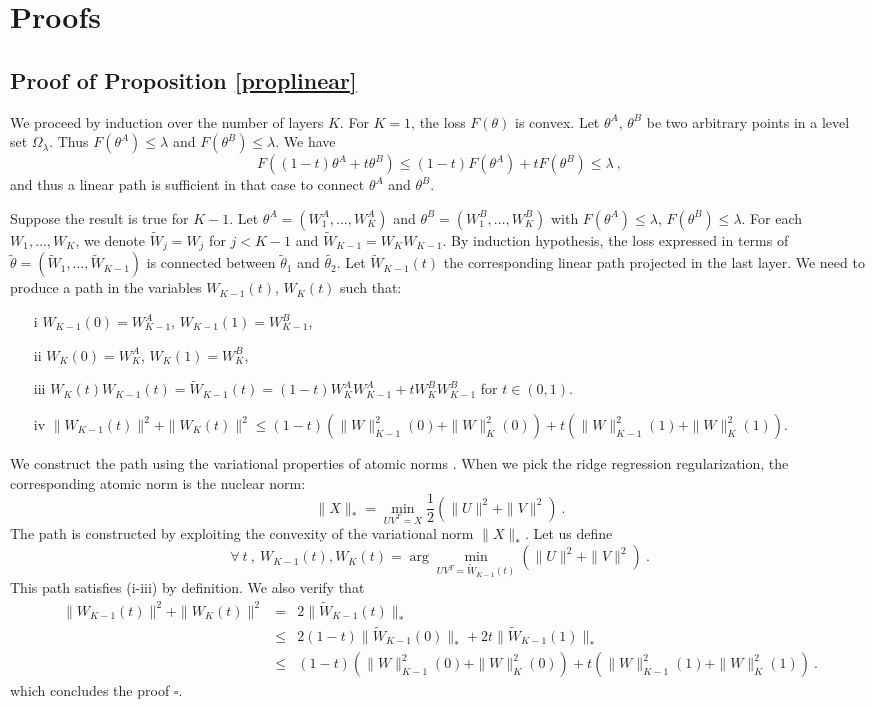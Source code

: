 \section{Proofs}

\subsection{Proof of Proposition \ref{proplinear}}

We proceed by induction over the number of layers $K$. 
For $K=1$, the loss $F(\theta)$ is convex. Let  $\theta^A$, $\theta^B$ be two arbitrary points 
in a level set $\Omega_\lambda$. Thus $F(\theta^A) \leq \lambda$ and $F(\theta^B) \leq \lambda$. We have
$$F( (1-t) \theta^A + t \theta^B) \leq (1-t) F(\theta^A) + t F(\theta^B) \leq \lambda~,$$
and thus a linear path is sufficient in that case to connect $\theta^A$ and $\theta^B$.

Suppose the result is true for $K-1$. Let $\theta^A = (W_1^A, \dots, W^A_K)$ and 
 $\theta^B = (W_1^B, \dots, W^B_K)$ with $F(\theta^A) \leq \lambda$, $F(\theta^B) \leq \lambda$.
For each $W_1, \dots, W_K$, we denote $\tilde{W}_j = W_j$ for $j < K-1$ and
$\tilde{W}_{K-1} = W_K W_{K-1}$. By induction hypothesis, the 
loss expressed in terms of $\tilde{\theta} = (\tilde{W}_1, \dots, \tilde{W}_{K-1})$ is connected 
between $\tilde{\theta}_1$ and $\tilde{\theta_2}$. Let $\tilde{W}_{K-1}(t)$ the corresponding 
linear path projected in the last layer. 
We need to produce a path in the variables $W_{K-1}(t)$, $W_K(t)$ 
such that:
\begin{itemize}
\item[i] $W_{K-1}(0) = W_{K-1}^A$, $W_{K-1}(1) = W_{K-1}^B$, 
\item[ii] $W_{K}(0) = W_{K}^A$, $W_{K}(1) = W_{K}^B$,
\item[iii] $W_{K}(t) W_{K-1}(t) = \tilde{W}_{K-1}(t) = (1-t) W_{K}^A W_{K-1}^A + t W_{K}^B W_{K-1}^B $ for $t \in (0,1)$. 
\item[iv] $\| W_{K-1}(t) \|^2 + \| W_{K}(t) \|^2 \leq (1-t) ( \| W \|_{K-1}^2(0) + \| W \|_{K}^2(0)  ) + t (\| W \|_{K-1}^2(1) + \| W \|_{K}^2(1))$.
\end{itemize} 
We construct the path using the variational properties of atomic norms \cite{bachatomic}. 
When we pick the ridge regression regularization, the corresponding atomic norm is the 
nuclear norm:
$$\| X \|_{*} = \min_{UV^T = X} \frac{1}{2}( \| U \|^2 + \| V \|^2)~.$$
The path is constructed by exploiting the convexity of the variational norm $\| X\|_{*}$. 
Let us define 
$$\forall~t~,~W_{K-1}(t), W_{K}(t) = \arg\min_{UV^T= \tilde{W}_{K-1}(t)} (\| U\|^2 + \|V \|^2)~. $$ 
This path satisfies (i-iii) by definition. We also verify that 
\begin{eqnarray*}
\| W_{K-1}(t) \|^2 + \| W_{K}(t) \|^2 &=& 2 \| \tilde{W}_{K-1}(t)\|_{*}   \\
&\leq & 2 (1-t) \|  \tilde{W}_{K-1}(0)\|_{*} + 2 t  \|  \tilde{W}_{K-1}(1)\|_{*} \\ 
&\leq & (1-t) ( \| W \|_{K-1}^2(0) + \| W \|_{K}^2(0)  ) + t (\| W \|_{K-1}^2(1) + \| W \|_{K}^2(1))~.
\end{eqnarray*}
which concludes the proof $\square$. 

